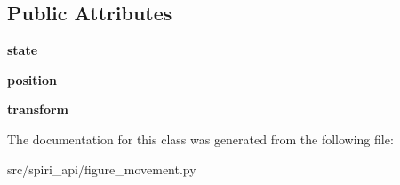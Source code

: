 \subsection*{Public Attributes}
\begin{DoxyCompactItemize}
\item 
\hypertarget{classspiri__api_1_1figure__movement_1_1_staterobot_a9c09e39041b79d9a85f4e35c2e149b6a}{{\bfseries state}}\label{classspiri__api_1_1figure__movement_1_1_staterobot_a9c09e39041b79d9a85f4e35c2e149b6a}

\item 
\hypertarget{classspiri__api_1_1figure__movement_1_1_staterobot_a4d2c172e525d59802a6fd7379eb149dd}{{\bfseries position}}\label{classspiri__api_1_1figure__movement_1_1_staterobot_a4d2c172e525d59802a6fd7379eb149dd}

\item 
\hypertarget{classspiri__api_1_1figure__movement_1_1_staterobot_a5d011ddfec9b48c254d0e89ede86e8d3}{{\bfseries transform}}\label{classspiri__api_1_1figure__movement_1_1_staterobot_a5d011ddfec9b48c254d0e89ede86e8d3}

\end{DoxyCompactItemize}


The documentation for this class was generated from the following file\-:\begin{DoxyCompactItemize}
\item 
src/spiri\-\_\-api/figure\-\_\-movement.\-py\end{DoxyCompactItemize}
